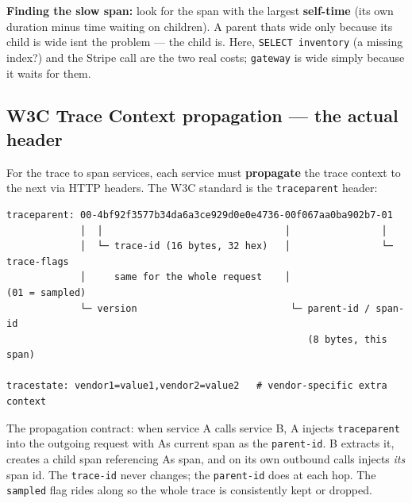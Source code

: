 \documentclass[11pt]{article}
\begin{document}
\textbf{Finding the slow span:} look for the span with the largest \textbf{self-time} (its own duration minus time waiting on children). A parent that\textquotesingle s wide only because its child is wide isn\textquotesingle t the problem --- the child is. Here, \texttt{SELECT\ inventory} (a missing index?) and the Stripe call are the two real costs; \texttt{gateway} is wide simply because it waits for them.

\subsection{W3C Trace Context propagation --- the actual header}\label{w3c-trace-context-propagation--the-actual-header}

For the trace to span services, each service must \textbf{propagate} the trace context to the next via HTTP headers. The W3C standard is the \texttt{traceparent} header:

\setcodelang{}

\begin{verbatim}
traceparent: 00-4bf92f3577b34da6a3ce929d0e0e4736-00f067aa0ba902b7-01
             │  │                                │                │
             │  └─ trace-id (16 bytes, 32 hex)   │                └─ trace-flags
             │     same for the whole request    │                   (01 = sampled)
             └─ version                           └─ parent-id / span-id
                                                     (8 bytes, this span)

tracestate: vendor1=value1,vendor2=value2   # vendor-specific extra context
\end{verbatim}

The propagation contract: when service A calls service B, A injects \texttt{traceparent} into the outgoing request with A\textquotesingle s current span as the \texttt{parent-id}. B extracts it, creates a child span referencing A\textquotesingle s span, and on its own outbound calls injects \emph{its} span id. The \texttt{trace-id} never changes; the \texttt{parent-id} does at each hop. The \texttt{sampled} flag rides along so the whole trace is consistently kept or dropped.

\end{document}

